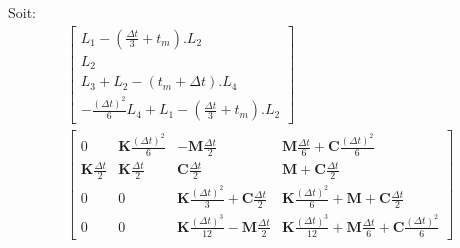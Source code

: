 \documentclass[12pt,a4paper]{report}
\begin{document}
Soit:
\begin{equation}
\begin{array}{c}
	\begin{bmatrix}	
		  L_1 - \left( \frac{\Delta t}{3} + t_m \right).L_2
		\\ L_2
		\\ L_3 + L_2 - (t_m+\Delta t).L_4
		\\  -\frac{(\Delta t)^2}{6} L_4 
			+ L_1 
			- \left( \frac{\Delta t}{3} + t_m \right).L_2
	\end{bmatrix}
	\\
		\begin{bmatrix}	     
			   0 
			&
			   \mathbf{K} \frac{(\Delta t)^2}{6}
		   	&   
			   -\mathbf{M}
			   		\frac{\Delta t}{2}   
			&
			   \mathbf{M}	\frac{ \Delta t}{6} 
			   +\mathbf{C} \frac{(\Delta t)^2}{6} 
		\\   
		   		\mathbf{K} \frac{\Delta t}{2}
			&
		   		\mathbf{K} \frac{\Delta t}{2} 
		   	&
		   		\mathbf{C} \frac{\Delta t}{2}
			&
			   \mathbf{M} 
			   +\mathbf{C} \frac{\Delta t}{2}
		\\    
		   		0
		   	& 
		   		0
		   	&
			   	\mathbf{K}
			   		\frac{(\Delta t)^2}{3} 
		   		+\mathbf{C} \frac{\Delta t}{2}
		   	&
		   		\mathbf{K} \frac{(\Delta t)^2}{6} 
		   		+\mathbf{M} 
			   	+\mathbf{C} \frac{\Delta t}{2}
		\\    
		   		0
		   	&
		   		0
		   	&
		   		\mathbf{K} \frac{(\Delta t)^3}{12}
		   		-\mathbf{M}
			   		\frac{\Delta t}{2} 
		   	&
		   		\mathbf{K} \frac{(\Delta t)^3}{12}
		   		+\mathbf{M} \frac{\Delta t}{6} 
			   +\mathbf{C} \frac{(\Delta t)^2}{6} 
	\end{bmatrix}
\end{array}
\end{equation}
\end{document}

